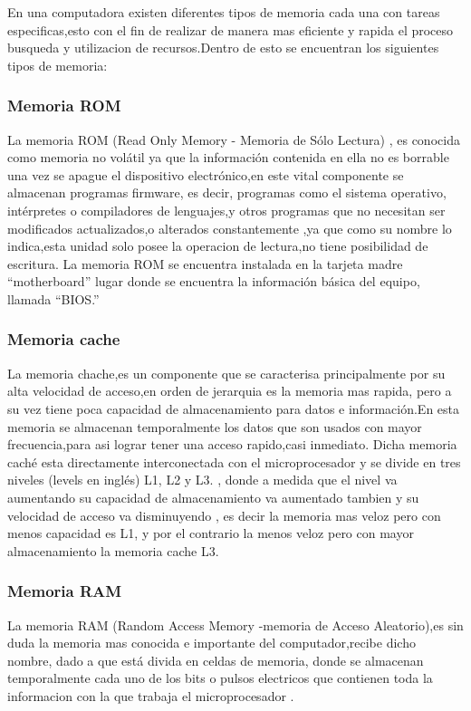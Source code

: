 \documentclass{article}
\begin{document}
En una computadora existen diferentes tipos de memoria cada una con tareas especificas,esto con el fin de realizar de manera mas eficiente y rapida el proceso busqueda y utilizacion de recursos.Dentro de esto se encuentran los siguientes tipos de memoria:

\subsubsection{Memoria ROM}
La memoria ROM (Read Only Memory - Memoria de Sólo Lectura) \cite{augusto}, es conocida como memoria no volátil ya que la información contenida en ella
no es borrable una vez se apague el dispositivo electrónico,en este vital componente se almacenan programas firmware, es decir, programas como el
sistema operativo, intérpretes o compiladores de lenguajes,y otros programas que no necesitan ser modificados actualizados,o alterados constantemente \cite{memorias},ya que como su nombre lo indica,esta unidad  solo posee la operacion de lectura,no tiene posibilidad de escritura.
La memoria ROM se encuentra instalada en la tarjeta madre “motherboard” lugar donde se encuentra la información básica del equipo, llamada “BIOS.”

\subsubsection{Memoria cache}
La memoria chache,es un componente que se caracterisa  principalmente por su alta velocidad de acceso,en orden de jerarquia es la memoria mas rapida, pero a su vez tiene poca capacidad de almacenamiento para datos e información.En esta memoria se almacenan temporalmente los datos que son usados con mayor frecuencia,para asi lograr tener una acceso rapido,casi inmediato\cite{arquitectura}. Dicha memoria caché esta directamente interconectada con el microprocesador y se divide en tres niveles (levels en inglés) L1, L2 y L3. \cite{augusto}, donde a medida que el nivel va aumentando su capacidad de almacenamiento va aumentado tambien y su velocidad de acceso va disminuyendo , es decir la memoria mas veloz pero con menos capacidad es L1, y por el contrario la menos veloz pero con mayor almacenamiento la memoria cache L3.

\subsubsection{Memoria RAM}
La memoria RAM (Random Access Memory -memoria de Acceso Aleatorio),es sin duda la memoria mas conocida e importante del computador,recibe dicho nombre, dado a  que está divida en celdas de memoria, donde se almacenan temporalmente cada uno de los bits o pulsos electricos que contienen toda la informacion con la que trabaja el microprocesador \cite{augusto}.\\
\end{document}
